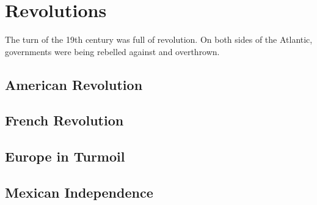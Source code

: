 \chapter{Revolutions}

The turn of the 19th century was full of revolution.
On both sides of the Atlantic, governments were being rebelled against and overthrown.

\section{American Revolution}

\section{French Revolution}

\section{Europe in Turmoil}

\section{Mexican Independence}
